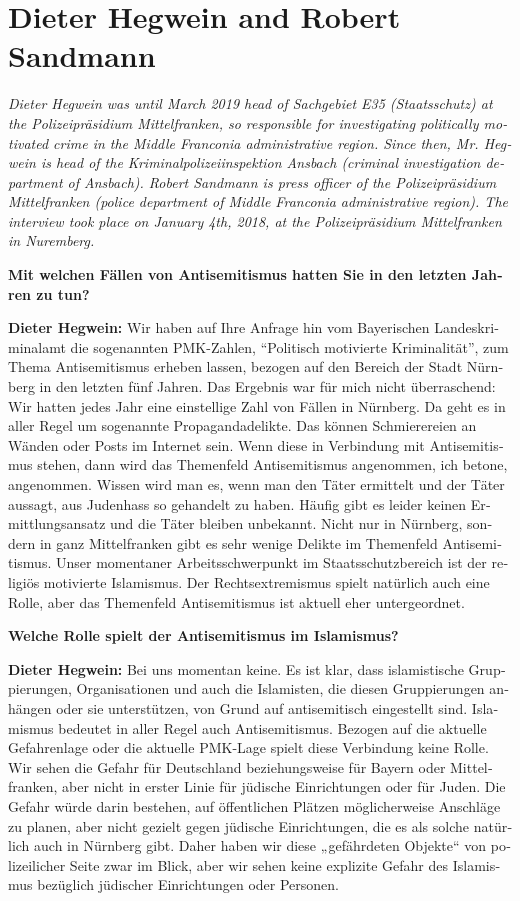 \section{Dieter Hegwein and Robert Sandmann}
\begin{otherlanguage}{ngerman}
\textit{Dieter Hegwein was until March 2019 head of Sachgebiet E35 (Staatsschutz) at the Polizeipräsidium Mittelfranken, so responsible for investigating politically motivated crime in the Middle Franconia administrative region. Since then, Mr. Hegwein is head of the Kriminalpolizeiinspektion Ansbach (criminal investigation department of Ansbach). Robert Sandmann is press officer of the Polizeipräsidium Mittelfranken (police department of Middle Franconia administrative region). 
The interview took place on January 4th, 2018, at the Polizeipräsidium Mittelfranken in Nuremberg.
}\par 
\vspace*{2em}
\textbf{Mit welchen Fällen von Antisemitismus hatten Sie in den letzten Jahren zu tun?}

\textbf{Dieter Hegwein:} Wir haben auf Ihre Anfrage hin vom Bayerischen Landeskriminalamt die sogenannten PMK-Zahlen, ``Politisch motivierte Kriminalität'', zum Thema Antisemitismus erheben lassen, bezogen auf den Bereich der Stadt Nürnberg in den letzten fünf Jahren. Das Ergebnis war für mich nicht überraschend: Wir hatten jedes Jahr eine einstellige Zahl von Fällen in Nürnberg. Da geht es in aller Regel um sogenannte Propagandadelikte. Das können Schmierereien an Wänden oder Posts im Internet sein. Wenn diese in Verbindung mit Antisemitismus stehen, dann wird das Themenfeld Antisemitismus angenommen, ich betone, angenommen. Wissen wird man es, wenn man den Täter ermittelt und der Täter aussagt, aus Judenhass so gehandelt zu haben. Häufig gibt es leider keinen Ermittlungsansatz und die Täter bleiben unbekannt. Nicht nur in Nürnberg, sondern in ganz Mittelfranken gibt es sehr wenige Delikte im Themenfeld Antisemitismus. Unser momentaner Arbeitsschwerpunkt im Staatsschutzbereich ist der religiös motivierte Islamismus. Der Rechtsextremismus spielt natürlich auch eine Rolle, aber das Themenfeld Antisemitismus ist aktuell eher untergeordnet. 

\textbf{Welche Rolle spielt der Antisemitismus im Islamismus?}

\textbf{Dieter Hegwein:} Bei uns momentan keine. Es ist klar, dass islamistische Gruppierungen, Organisationen und auch die Islamisten, die diesen Gruppierungen anhängen oder sie unterstützen, von Grund auf antisemitisch eingestellt sind. Islamismus bedeutet in aller Regel auch Antisemitismus. Bezogen auf die aktuelle Gefahrenlage oder die aktuelle PMK-Lage spielt diese Verbindung keine Rolle. Wir sehen die Gefahr für Deutschland beziehungsweise für Bayern oder Mittelfranken, aber nicht in erster Linie für jüdische Einrichtungen oder für Juden. Die Gefahr würde darin bestehen, auf öffentlichen Plätzen möglicherweise Anschläge zu planen, aber nicht gezielt gegen jüdische Einrichtungen, die es als solche natürlich auch in Nürnberg gibt. Daher haben wir diese „gefährdeten Objekte“ von polizeilicher Seite zwar im Blick, aber wir sehen keine explizite Gefahr des Islamismus bezüglich jüdischer Einrichtungen oder Personen.


\end{otherlanguage}
